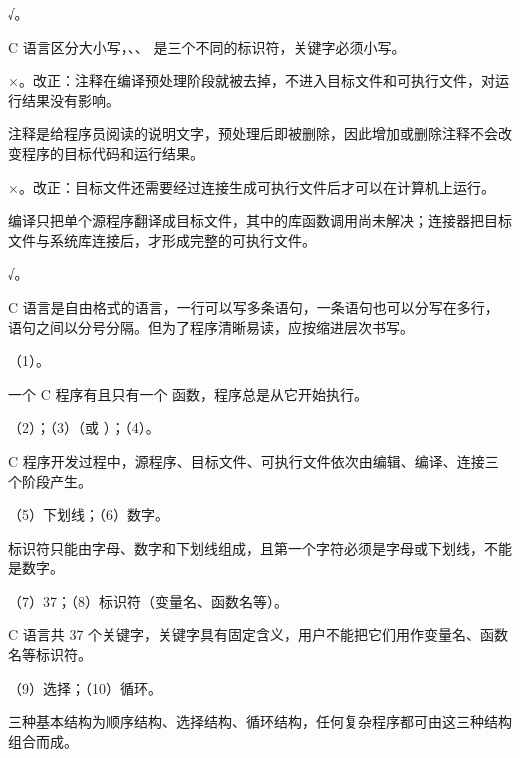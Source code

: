 \documentclass[a4paper,11pt]{article}
\begin{document}
\q √。\begin{analysis}C 语言区分大小写，、、 是三个不同的标识符，关键字必须小写。\end{analysis}

\q ×。改正：注释在编译预处理阶段就被去掉，不进入目标文件和可执行文件，对运行结果没有影响。\begin{analysis}注释是给程序员阅读的说明文字，预处理后即被删除，因此增加或删除注释不会改变程序的目标代码和运行结果。\end{analysis}

\q ×。改正：目标文件还需要经过连接生成可执行文件后才可以在计算机上运行。\begin{analysis}编译只把单个源程序翻译成目标文件，其中的库函数调用尚未解决；连接器把目标文件与系统库连接后，才形成完整的可执行文件。\end{analysis}

\q √。\begin{analysis}C 语言是自由格式的语言，一行可以写多条语句，一条语句也可以分写在多行，语句之间以分号分隔。但为了程序清晰易读，应按缩进层次书写。\end{analysis}


\q （1）。\begin{analysis}一个 C 程序有且只有一个  函数，程序总是从它开始执行。\end{analysis}

\q （2）；（3）（或 ）；（4）。\begin{analysis}C 程序开发过程中，源程序、目标文件、可执行文件依次由编辑、编译、连接三个阶段产生。\end{analysis}

\q （5）下划线；（6）数字。\begin{analysis}标识符只能由字母、数字和下划线组成，且第一个字符必须是字母或下划线，不能是数字。\end{analysis}

\q （7）37；（8）标识符（变量名、函数名等）。\begin{analysis}C 语言共 37 个关键字，关键字具有固定含义，用户不能把它们用作变量名、函数名等标识符。\end{analysis}

\q （9）选择；（10）循环。\begin{analysis}三种基本结构为顺序结构、选择结构、循环结构，任何复杂程序都可由这三种结构组合而成。\end{analysis}
\end{document}

